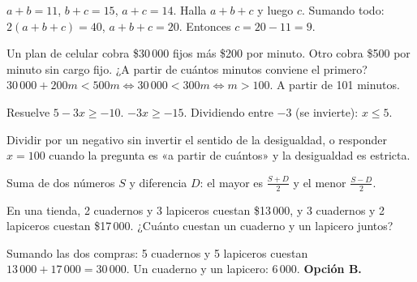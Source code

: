\begin{ejemplo}
$a + b = 11$, $b + c = 15$, $a + c = 14$. Halla $a + b + c$ y luego $c$.
\solucion Sumando todo: $2(a + b + c) = 40$, $a + b + c = 20$. Entonces $c = 20 - 11 = 9$.
\end{ejemplo}

\begin{ejemplo}
Un plan de celular cobra \$30\,000 fijos más \$200 por minuto. Otro cobra \$500 por minuto sin cargo fijo. ¿A partir de
cuántos minutos conviene el primero?
\solucion $30\,000 + 200m < 500m \iff 30\,000 < 300m \iff m > 100$. A partir de 101 minutos.
\end{ejemplo}

\begin{ejemplo}
Resuelve $5 - 3x \ge -10$.
\solucion $-3x \ge -15$. Dividiendo entre $-3$ (se invierte): $x \le 5$.
\end{ejemplo}

\begin{trampa}
Dividir por un negativo sin invertir el sentido de la desigualdad, o responder $x = 100$ cuando la pregunta es «a partir
de cuántos» y la desigualdad es estricta.
\end{trampa}

\begin{atajo}
Suma de dos números $S$ y diferencia $D$: el mayor es $\tfrac{S + D}{2}$ y el menor $\tfrac{S - D}{2}$.
\end{atajo}

\begin{reto}
En una tienda, 2 cuadernos y 3 lapiceros cuestan \$13\,000, y 3 cuadernos y 2 lapiceros cuestan \$17\,000. ¿Cuánto
cuestan un cuaderno y un lapicero juntos?
\end{reto}

\begin{retoresuelto}
Sumando las dos compras: 5 cuadernos y 5 lapiceros cuestan $13\,000 + 17\,000 = 30\,000$. Un cuaderno y un lapicero:
$6\,000$. \textbf{Opción B.}
\end{retoresuelto}

